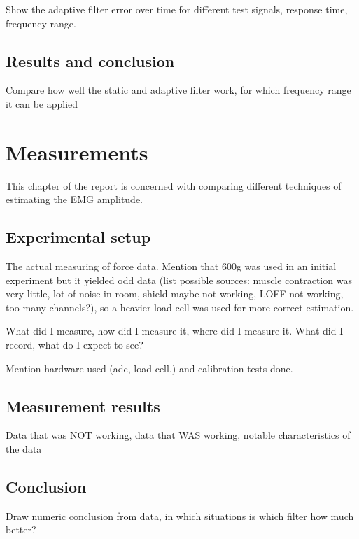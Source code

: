Show the adaptive filter error over time for different test signals, response time, frequency range.

\section{Results and conclusion}

Compare how well the static and adaptive filter work, for which frequency range it can be applied


\chapter{Measurements}
This chapter of the report is concerned with comparing different techniques of estimating the EMG amplitude.

\section{Experimental setup}
The actual measuring of force data. Mention that 600g was used in an initial experiment but it yielded odd data (list possible sources: muscle contraction was very little, lot of noise in room, shield maybe not working, LOFF not working, too many channels?), so a heavier load cell was used for more correct estimation.

What did I measure, how did I measure it, where did I measure it. What did I record, what do I expect to see?

Mention hardware used (adc, load cell,) and calibration tests done.
\section{Measurement results}
Data that was NOT working, data that WAS working, notable characteristics of the data


\section{Conclusion}
Draw numeric conclusion from data, in which situations is which filter how much better?